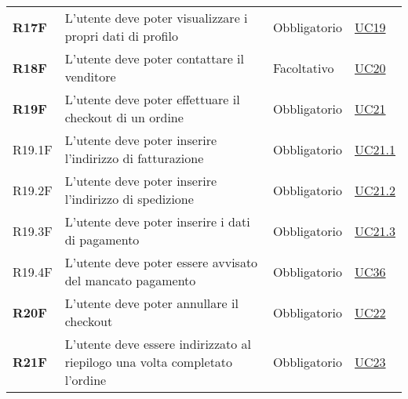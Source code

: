 \begin{center}
\begin{longtable}[!h]{p{50px} p{245px} p{75px} p{50px}}
        \textbf{R17F}                         & L'utente deve poter visualizzare i propri dati di profilo                                                                                              & Obbligatorio             & \hyperref[sec:UC19]{UC19}                      \\
        \textbf{R18F}                         & L'utente deve poter contattare il venditore                                                                                                            & Facoltativo              & \hyperref[sec:UC20]{UC20}                      \\
        \textbf{R19F}                         & L'utente deve poter effettuare il checkout di un ordine                                                                                                & Obbligatorio             & \hyperref[sec:UC21]{UC21}                      \\
        R19.1F                                & L'utente deve poter inserire l'indirizzo di fatturazione                                                                                               & Obbligatorio             & \hyperref[sec:UC21.1]{UC21.1}                  \\
        R19.2F                                & L'utente deve poter inserire l'indirizzo di spedizione                                                                                                 & Obbligatorio             & \hyperref[sec:UC21.2]{UC21.2}                  \\
        R19.3F                                & L'utente deve poter inserire i dati di pagamento                                                                                                       & Obbligatorio             & \hyperref[sec:UC21.3]{UC21.3}                  \\
        R19.4F                                & L'utente deve poter essere avvisato del mancato pagamento                                                                                              & Obbligatorio             & \hyperref[sec:UC36]{UC36}                      \\
        \textbf{R20F}                         & L'utente deve poter annullare il checkout                                                                                                              & Obbligatorio             & \hyperref[sec:UC22]{UC22}                      \\
        \textbf{R21F}                         & L'utente deve essere indirizzato al riepilogo una volta completato l'ordine                                                                            & Obbligatorio             & \hyperref[sec:UC23]{UC23}                      \\

\end{longtable}
\end{center}
